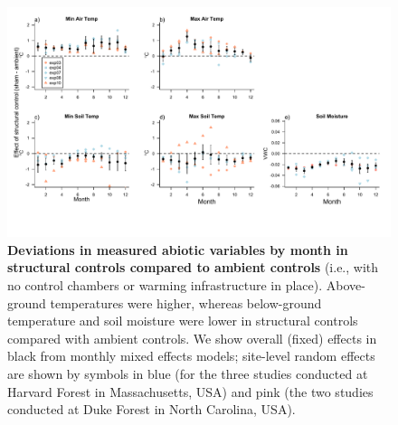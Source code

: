 \documentclass{article}
\begin{document}
 
 \begin{figure}[p]
\centering
 \includegraphics{../Analyses/figures/ShamVSAmbient_all.pdf}  
 \caption{\textbf{Deviations in measured abiotic variables by month in structural controls compared to ambient controls} (i.e., with no control chambers or warming infrastructure in place). Above-ground temperatures were higher, whereas below-ground temperature and soil moisture were lower in structural controls compared with ambient controls. We show overall (fixed) effects in black from monthly mixed effects models; site-level random effects are shown by symbols in blue (for the three studies conducted at Harvard Forest in Massachusetts, USA) and pink (the two studies conducted at Duke Forest in North Carolina, USA).}
 \label{fig:shamamb}
 \end{figure}
\clearpage
\end{document}

